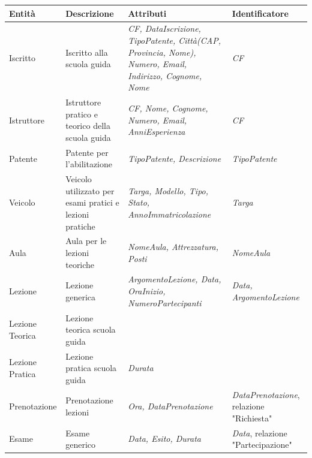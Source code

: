 \documentclass[10pt,twoside]{article}
\begin{document}
{     \begin{table}[H]
        \centering
        \begin{tabularx}{\textwidth}{|>{\centering\arraybackslash}p{2.6cm}|>{\centering\arraybackslash}X|>{\centering\arraybackslash}p{4.85cm}|>{\centering\arraybackslash}X|}
            \hline
            \rowcolor{lightgray!40}
            \textbf{Entità} & \textbf{Descrizione} & \textbf{Attributi} & \textbf{Identificatore} \\
            \hline
            \rowcolor{white!40}
            Iscritto & Iscritto alla scuola guida & \textit{CF, DataIscrizione, TipoPatente, Città(CAP, Provincia, Nome), Numero, Email, Indirizzo, Cognome, Nome} & \textit{CF}\\
            \hline
            \rowcolor{white!40}
            Istruttore & Istruttore pratico e teorico della scuola guida & \textit{CF, Nome, Cognome, Numero, Email, AnniEsperienza} & \textit{CF} \\
            \hline
            \rowcolor{white!40}
            Patente & Patente per l'abilitazione & \textit{TipoPatente, Descrizione} & \textit{TipoPatente}\\
            \hline
            \rowcolor{white!40}
            Veicolo & Veicolo utilizzato per esami pratici e lezioni pratiche & \textit{Targa, Modello, Tipo, Stato, AnnoImmatricolazione} & \textit{Targa}\\
            \hline
            \rowcolor{white!40}
            Aula & Aula per le lezioni teoriche & \textit{NomeAula, Attrezzatura, Posti} & \textit{NomeAula}\\
            \hline
            \rowcolor{white!40}
            Lezione & Lezione generica & \textit{ArgomentoLezione, Data, OraInizio, NumeroPartecipanti} & \textit{Data, ArgomentoLezione}\\
            \hline
            \rowcolor{white!40}
            Lezione Teorica & Lezione teorica scuola guida & & \\
            \hline
            \rowcolor{white!40}
            Lezione Pratica & Lezione pratica scuola guida & \textit{Durata} & \\
            \hline
            \rowcolor{white!40}
            Prenotazione & Prenotazione lezioni & \textit{Ora, DataPrenotazione} & \textit{DataPrenotazione}, relazione "Richiesta"\\
            \hline
            \rowcolor{white!40}
            Esame & Esame generico & \textit{Data, Esito, Durata} & \textit{Data}, relazione "Partecipazione"\\

\end{tabularx}
\end{table}}
\end{document}
